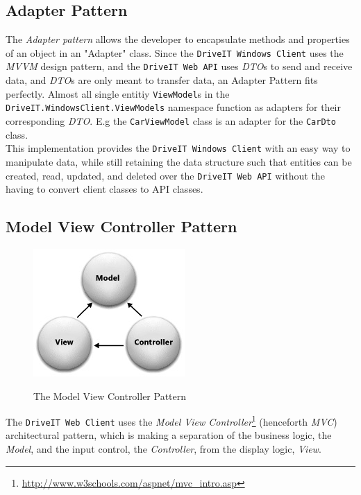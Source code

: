 \subsection{Adapter Pattern}
The \textit{Adapter pattern} allows the developer to encapsulate methods and properties of an object in an "Adapter" class. Since the \texttt{DriveIT Windows Client} uses the \textit{MVVM} design pattern, and the \texttt{DriveIT Web API} uses \textit{DTO}s to send and receive data, and \textit{DTO}s are only meant to transfer data, an Adapter Pattern fits perfectly. Almost all single entitiy \texttt{ViewModel}s in the \texttt{DriveIT.WindowsClient.ViewModels} namespace function as adapters for their corresponding \textit{DTO}. E.g the \texttt{CarViewModel} class is an adapter for the \texttt{CarDto} class.\\ 

This implementation provides the \texttt{DriveIT Windows Client} with an easy way to manipulate data, while still retaining the data structure such that entities can be created, read, updated, and deleted over the \texttt{DriveIT Web API} without the having to convert client classes to API classes.

\subsection{Model View Controller Pattern}
\label{sec:MVC}
\begin{figure}[H]
	\centering
	\includegraphics[width=\textwidth]{Figures/WebImages/MVCPattern}\\
	\caption{The Model View Controller Pattern}
	\label{fig:MVCPattern}
\end{figure}
The \texttt{DriveIT Web Client} uses the \textit{Model View Controller}\footnote{\url{http://www.w3schools.com/aspnet/mvc_intro.asp}} (henceforth \textit{MVC}) architectural pattern, which is making a separation of the business logic, the \textit{Model}, and the input control, the \textit{Controller}, from the display logic, \textit{View}.

